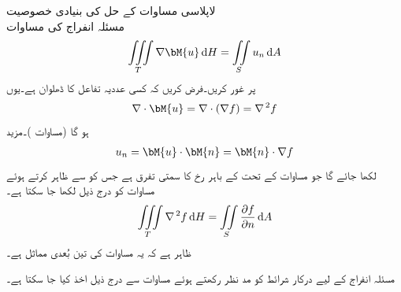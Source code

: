 \quad لاپلاسی مساوات کے حل کی بنیادی خصوصیت\\
مسئلہ انفراج کی مساوات
\begin{align}\label{مساوات_خطی_تکمل_مسئلہ_پھیلاو_دوبارہ_الف}
\iiint\limits_T \nabla \bM{u}\dif H=\iint\limits_S u_n \dif A
\end{align}
پر غور کریں۔فرض کریں کہ  کسی عددیہ تفاعل کا ڈھلوان  ہے۔یوں
\begin{align*}
\nabla \cdot \bM{u}=\nabla \cdot (\nabla f)=\nabla^{\,2}f
\end{align*}
ہو گا (مساوات )۔مزید 
\begin{align*}
u_n=\bM{u}\cdot \bM{n}=\bM{n}\cdot \nabla f
\end{align*}
لکھا جائے گا جو مساوات  کے تحت  کے باہر رخ  کا سمتی تفرق ہے جس کو  سے ظاہر کرتے ہوئے  مساوات  کو درج ذیل لکھا جا سکتا ہے۔
\begin{align}\label{مساوات_خطی_تکمل_مسئلہ_پھیلاو_دوبارہ_ب}
\iiint\limits_T \nabla^{\,2}f\dif H=\iint\limits_S \frac{\partial f}{\partial n}\dif A
\end{align}
ظاہر ہے کہ یہ مساوات  کی تین بُعدی مماثل ہے۔

مسئلہ انفراج کے لیے درکار شرائط کو مد نظر رکھتے ہوئے  مساوات  سے درج ذیل اخذ کیا جا سکتا ہے۔ 

